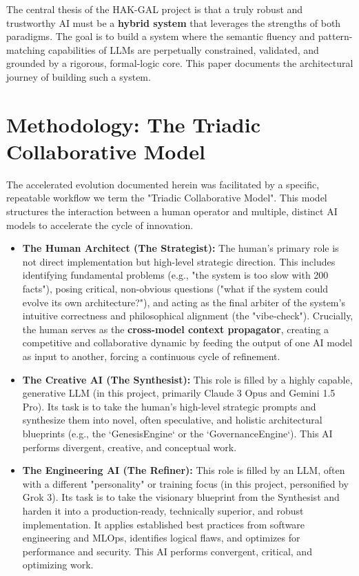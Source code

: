 \documentclass[11pt, a4paper]{article}
\begin{document}
The central thesis of the HAK-GAL project is that a truly robust and trustworthy AI must be a \textbf{hybrid system} that leverages the strengths of both paradigms. The goal is to build a system where the semantic fluency and pattern-matching capabilities of LLMs are perpetually constrained, validated, and grounded by a rigorous, formal-logic core. This paper documents the architectural journey of building such a system.

\section{Methodology: The Triadic Collaborative Model}
\label{sec:methodology}

The accelerated evolution documented herein was facilitated by a specific, repeatable workflow we term the "Triadic Collaborative Model". This model structures the interaction between a human operator and multiple, distinct AI models to accelerate the cycle of innovation.

\begin{itemize}
    \item \textbf{The Human Architect (The Strategist):} The human's primary role is not direct implementation but high-level strategic direction. This includes identifying fundamental problems (e.g., "the system is too slow with 200 facts"), posing critical, non-obvious questions ("what if the system could evolve its own architecture?"), and acting as the final arbiter of the system's intuitive correctness and philosophical alignment (the "vibe-check"). Crucially, the human serves as the \textbf{cross-model context propagator}, creating a competitive and collaborative dynamic by feeding the output of one AI model as input to another, forcing a continuous cycle of refinement.
    
    \item \textbf{The Creative AI (The Synthesist):} This role is filled by a highly capable, generative LLM (in this project, primarily Claude 3 Opus and Gemini 1.5 Pro). Its task is to take the human's high-level strategic prompts and synthesize them into novel, often speculative, and holistic architectural blueprints (e.g., the `GenesisEngine` or the `GovernanceEngine`). This AI performs divergent, creative, and conceptual work.
    
    \item \textbf{The Engineering AI (The Refiner):} This role is filled by an LLM, often with a different "personality" or training focus (in this project, personified by Grok 3). Its task is to take the visionary blueprint from the Synthesist and harden it into a production-ready, technically superior, and robust implementation. It applies established best practices from software engineering and MLOps, identifies logical flaws, and optimizes for performance and security. This AI performs convergent, critical, and optimizing work.
\end{itemize}
\end{document}
